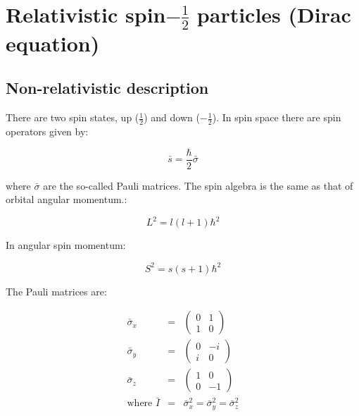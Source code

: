 
\chapter{Relativistic spin\texorpdfstring{$-\frac{1}{2}$}{-1Over2} particles (Dirac equation)}

\section{Non-relativistic description}

There are two spin states, up ($\frac{1}{2}$) and down ($-\frac{1}{2}$).  In spin space there are spin operators given by:

\[
  \bar{s} = \frac{\hbar}{2}\bar{\sigma}
\]

where $\bar{\sigma}$ are the so-called Pauli matrices.  The spin algebra is the same as that of orbital angular momentum.:

\[
  L^2 = l(l+1)\hbar^2
\]

In angular spin momentum:

\[
  S^2 = s(s+1)\hbar^2
\]

The Pauli matrices are:

\begin{eqnarray*}
  \bar{\sigma}_x & = &
  \left(
    \begin{array}{cc}
    0 & 1 \\
    1 & 0
    \end{array}
  \right)
  \\
  \bar{\sigma}_y & = &
  \left(
    \begin{array}{cc}
    0 & -i \\
    i & 0
    \end{array}
  \right)
  \\
  \bar{\sigma}_z & = &
  \left(
    \begin{array}{cc}
    1 & 0 \\
    0 & -1
    \end{array}
  \right)
  \\
  \textrm{where } \bar{I} & = & \bar{\sigma}_x^2 = \bar{\sigma}_y^2 = \bar{\sigma}_z^2
\end{eqnarray*}

